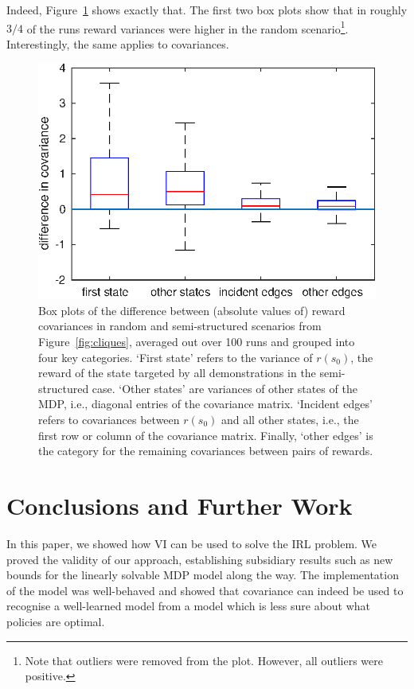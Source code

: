 \documentclass{mpaper}
\begin{document}
Indeed, Figure~\ref{fig:covariance_boxplots} shows exactly that. The first two
box plots show that in roughly $3/4$ of the runs reward variances were higher in
the random scenario\footnote{Note that outliers were removed from the plot.
  However, all outliers were positive.}. Interestingly, the same applies to
covariances.

\begin{figure}
  \centering
  \includegraphics[width=\columnwidth]{figures/boxplots}
  \caption{Box plots of the difference between (absolute values of) reward
    covariances in random and semi-structured scenarios from
    Figure~\ref{fig:cliques}, averaged out over 100 runs and grouped into four
    key categories. `First state' refers to the variance of $r(s_0)$, the reward
    of the state targeted by all demonstrations in the semi-structured case.
    `Other states' are variances of other states of the MDP, i.e., diagonal
    entries of the covariance matrix. `Incident edges' refers to covariances
    between $r(s_0)$ and all other states, i.e., the first row or column of the
    covariance matrix. Finally, `other edges' is the category for the remaining
    covariances between pairs of rewards.}
  \label{fig:covariance_boxplots}
\end{figure}

\section{Conclusions and Further Work} \label{sec:conclusions}

In this paper, we showed how VI can be used to solve the IRL problem. We
proved the validity of our approach, establishing subsidiary results such as new
bounds for the linearly solvable MDP model along the way. The implementation of
the model was well-behaved and showed that covariance can indeed be used to
recognise a well-learned model from a model which is less sure about what
policies are optimal.
\end{document}
